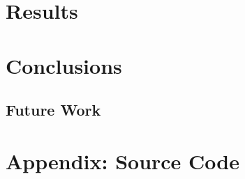 \documentclass[a4paper,12pt]{article}
\begin{document}
\section{Results}


\section{Conclusions}


\subsection{Future Work}







\appendix
\section{Appendix: Source Code}



\end{document}
